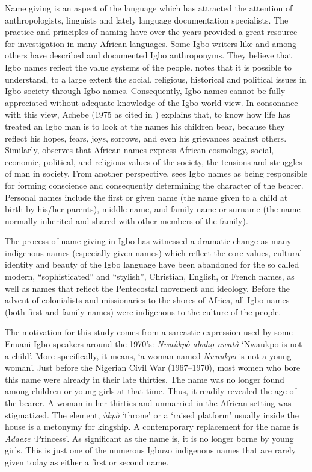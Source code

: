 \documentclass[output=paper]{langscibook}
\begin{document}
Name giving is an aspect of the language which has attracted the attention of anthropologists, linguists and lately language documentation specialists. The practice and principles of naming have over the years provided a great resource for investigation in many African languages. Some Igbo writers like \citet{Ezeanya1967,Ubahakwe1981,Onukawa1999,Onukawa2000,Iwundu1994,Ezeude2000,Nwigwe2001,OkaforEtAl2008} and \citet{Onumajuru2013} among others have described and documented Igbo anthroponyms. They believe that Igbo names reflect the value systems of the people. \citet{Madu1996} notes that it is possible to understand, to a large extent the social, religious, historical and political issues in Igbo society through Igbo names. Consequently, Igbo names cannot be fully appreciated without adequate knowledge of the Igbo world view. In consonance with this view, Achebe (1975 as cited in \citealt{Onukawa2000}) explains that, to know how life has treated an Igbo man is to look at the names his children bear, because they reflect his hopes, fears, joys, sorrows, and even his grievances against others. Similarly, \citet{Ekwunife1989} observes that African names express African cosmology, social, economic, political, and religious values of the society, the tensions and struggles of man in society. From another perspective, \citet{Onyema2009} sees Igbo names as being responsible for forming conscience and consequently determining the character of the bearer. Personal names include the first or given name (the name given to a child at birth by his/her parents), middle name, and family name or surname (the name normally inherited and shared with other members of the family).

The process of name giving in Igbo has witnessed a dramatic change as many indigenous  names (especially given names) which reflect the core values, cultural identity and beauty of the Igbo language have been abandoned for the so called modern, ``sophisticated'' and ``stylish'', Christian, English, or French names, as well as  names that reflect the Pentecostal movement and ideology. Before the advent of colonialists and missionaries to the shores of Africa, all Igbo names (both first and family names) were indigenous to the culture of the people. 

The motivation for this study comes from a sarcastic expression used by some Enuani-Igbo speakers around the 1970’s: \textit{Nwaùkpò abụ̄họ nwatà} ‘Nwaukpo is not a child’. More specifically, it means, ‘a woman named \textit{Nwaukpo} is not a young woman’. Just before the Nigerian Civil War (1967--1970), most women who bore this name were already in their late thirties. The name was no longer found among children or young girls at that time. Thus, it readily revealed the age of the bearer. A woman in her thirties and unmarried in the African setting was stigmatized. The element, \textit{ùkpò} ‘throne’ or a ‘raised platform’ usually inside the house is a metonymy for kingship.  A contemporary replacement for the name is \textit{Adaeze} ‘Princess’. As significant as the name is, it is no longer borne by young girls. This is just one of the numerous Igbuzo indigenous names that are rarely given today as either a first or second name. 
\end{document}
